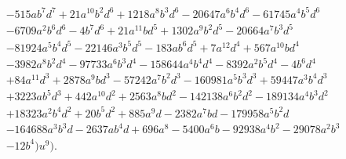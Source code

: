 \documentclass{gtpart}
\theoremstyle{definition}
\theoremstyle{remark}
\numberwithin{equation}{section}
\numberwithin{thm}{section}
\begin{document}
\begin{equation*}
\begin{split}
          & - 515 a b^7 d^7 + 21 a^{10} b^2 d^6 + 1218 a^8 b^3 d^6 - 20647 a^6 b^4 d^6 - 61745 a^4 b^5 d^6 \\
          & - 6709 a^2 b^6 d^6 - 4 b^7 d^6 + 21 a^{11} b d^5 + 1302 a^9 b^2 d^5 - 20664 a^7 b^3 d^5 \\
          & - 81924 a^5 b^4 d^5 - 22146 a^3 b^5 d^5 - 183 a b^6 d^5 + 7 a^{12} d^4 + 567 a^{10} b d^4 \\
          & - 3982 a^8 b^2 d^4 - 97733 a^6 b^3 d^4 - 158644 a^4 b^4 d^4 - 8392 a^2 b^5 d^4 - 4 b^6 d^4 \\
          & + 84 a^{11} d^3 + 2878 a^9 b d^3 - 57242 a^7 b^2 d^3 - 160981 a^5 b^3 d^3 + 59447 a^3 b^4 d^3 \\
          & + 3223 a b^5 d^3 + 442 a^{10} d^2 + 2563 a^8 b d^2 - 142138 a^6 b^2 d^2 - 189134 a^4 b^3 d^2 \\
          & + 18323 a^2 b^4 d^2 + 20 b^5 d^2 + 885 a^9 d - 2382 a^7 b d - 179958 a^5 b^2 d \\
          & - 164688 a^3 b^3 d - 2637 a b^4 d + 696 a^8 - 5400 a^6 b - 92938 a^4 b^2 - 29078 a^2 b^3 \\
          & - 12 b^4) u^9 \big).  
\end{split}
\end{equation*}

%
%
\end{document}
